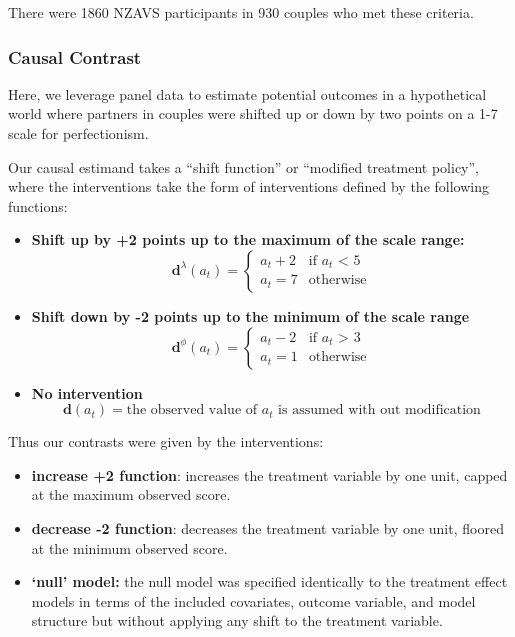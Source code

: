 \documentclass[
  singlecolumn]{article}
\providecommand{\tightlist}{%
  \setlength{\itemsep}{0pt}\setlength{\parskip}{0pt}}\usepackage{longtable,booktabs,array}
\begin{document}
There were 1860 NZAVS participants in 930 couples who met these
criteria.

\subsubsection{Causal Contrast}\label{causal-contrast}

Here, we leverage panel data to estimate potential outcomes in a
hypothetical world where partners in couples were shifted up or down by
two points on a 1-7 scale for perfectionism.

Our causal estimand takes a ``shift function'' or ``modified treatment
policy'', where the interventions take the form of interventions defined
by the following functions:

\begin{itemize}
\item
  \textbf{Shift up by +2 points up to the maximum of the scale range:}
  \[
   \mathbf{d}^\lambda (a_t) = \begin{cases} a_t + 2 & \text{if $a_t$ < 5} \\ 
  a_t = 7 & \text{otherwise} \end{cases}
   \]
\item
  \textbf{Shift down by -2 points up to the minimum of the scale range}
  \[
   \mathbf{d}^\phi (a_t) = \begin{cases} a_t - 2 & \text{if $a_t$ > 3} \\ 
  a_t = 1 & \text{otherwise} \end{cases}
   \]
\item
  \textbf{No intervention} \[
   \mathbf{d}(a_t) = \text{the observed value of $a_t$ is assumed with out modification}
   \]
\end{itemize}

Thus our contrasts were given by the interventions:

\begin{itemize}
\tightlist
\item
  \textbf{increase +2 function}: increases the treatment variable by one
  unit, capped at the maximum observed score.
\item
  \textbf{decrease -2 function}: decreases the treatment variable by one
  unit, floored at the minimum observed score.
\item
  \textbf{`null' model:} the null model was specified identically to the
  treatment effect models in terms of the included covariates, outcome
  variable, and model structure but without applying any shift to the
  treatment variable.
\end{itemize}
\end{document}
